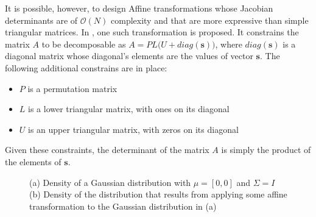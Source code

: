 It is possible, however, to design Affine transformations whose Jacobian determinants
are of $\mathcal{O}(N)$ complexity and that are more expressive than simple
triangular matrices. In \cite{Glow}, one such transformation is proposed. It
constrains the matrix $A$ to be decomposable as $A = PL\big(U + diag(\bm{s})\big)$,
where $diag(\bm{s})$ is a diagonal matrix whose diagonal's elements are
the values of vector $\bm{s}$. The following additional constrains are in place:
\begin{itemize}
    \item $P$ is a permutation matrix
    \item $L$ is a lower triangular matrix, with ones on its diagonal
    \item $U$ is an upper triangular matrix, with zeros on its diagonal
\end{itemize}

Given these constraints, the determinant of the matrix $A$ is simply the product
of the elements of $\bm{s}$.

\begin{figure}[!htb]
  \begin{subfigmatrix}{2}
  \end{subfigmatrix}
    \caption{(a) Density of a Gaussian distribution with $\mu = [0, 0]$ and $\Sigma = I$
    (b) Density of the distribution that results from applying some affine transformation to
    the Gaussian distribution in (a)
    }
  \label{fig:affine}
\end{figure}

